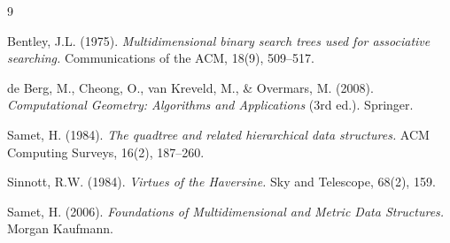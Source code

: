\documentclass[11pt, a4paper]{article}
\begin{document}
\newpage

\begin{thebibliography}{9}

Bentley, J.L. (1975).
\textit{Multidimensional binary search trees used for associative searching.}
Communications of the ACM, 18(9), 509--517.

de Berg, M., Cheong, O., van Kreveld, M., \& Overmars, M. (2008).
\textit{Computational Geometry: Algorithms and Applications} (3rd ed.).
Springer.

Samet, H. (1984).
\textit{The quadtree and related hierarchical data structures.}
ACM Computing Surveys, 16(2), 187--260.

Sinnott, R.W. (1984).
\textit{Virtues of the Haversine.}
Sky and Telescope, 68(2), 159.

Samet, H. (2006).
\textit{Foundations of Multidimensional and Metric Data Structures.}
Morgan Kaufmann.

\end{thebibliography}
\end{document}
